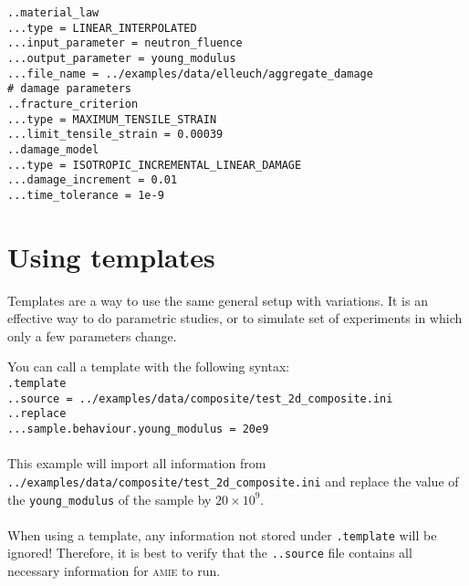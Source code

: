 \documentclass[10pt]{article}
\newcommand{\amie}{\textsc{amie}\xspace}
\begin{document}
\verb+..material_law+\\
\verb+...type = LINEAR_INTERPOLATED+\\
\verb+...input_parameter = neutron_fluence+\\
\verb+...output_parameter = young_modulus+\\
\verb+...file_name = ../examples/data/elleuch/aggregate_damage+\\
\verb+# damage parameters+\\
\verb+..fracture_criterion+\\
\verb+...type = MAXIMUM_TENSILE_STRAIN+\\
\verb+...limit_tensile_strain = 0.00039+\\
\verb+..damage_model+\\
\verb+...type = ISOTROPIC_INCREMENTAL_LINEAR_DAMAGE+\\
\verb+...damage_increment = 0.01+\\
\verb+...time_tolerance = 1e-9+

\section{Using templates}

Templates are a way to use the same general setup with variations. It is an effective way to do parametric studies, or to simulate set of experiments in which only a few parameters change.

You can call a template with the following syntax:\\

\noindent \verb+.template+\\
\verb+..source = ../examples/data/composite/test_2d_composite.ini+\\
\verb+..replace+\\
\verb+...sample.behaviour.young_modulus = 20e9+

\paragraph{} This example will import all information from \verb+../examples/data/composite/test_2d_composite.ini+ and replace the value of the \verb+young_modulus+ of the sample by $20 \times 10^{9}$.

\paragraph{} When using a template, any information not stored under \verb+.template+ will be ignored! Therefore, it is best to verify that the \verb+..source+ file contains all necessary information for \amie to run.
\end{document}
